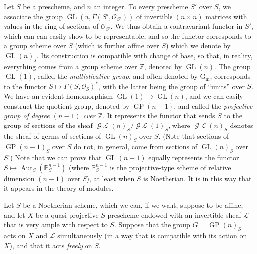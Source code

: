 \documentclass{article}
\newcommand{\oldpage}[1]{\marginpar{\footnotesize$\Big\vert$ \textit{p.~#1}}}
\theoremstyle{definition}
\theoremstyle{definition}
\theoremstyle{definition}
\theoremstyle{definition}
\theoremstyle{remark}
\begin{document}
Let \(S\) be a prescheme, and \(n\) an integer.
To every prescheme \(S'\) over \(S\), we associate the group \(\operatorname{GL}(n,\Gamma(S',{\mathcal{O}}_{S'}))\) of invertible \((n\times n)\) matrices with values in the ring of sections of \({\mathcal{O}}_{S'}\).
We thus obtain a contravariant functor in \(S'\), which can can easily show to be representable, and so the functor corresponds to a group scheme over \(S\) (which is further affine over \(S\)) which we denote by \(\operatorname{GL}(n)_s\).
Its construction is compatible with change of base, so that, in reality, everything comes from a group scheme over \(\mathbb{Z}\), denoted by \(\operatorname{GL}(n)\).
The group \(\operatorname{GL}(1)\), called the \emph{multiplicative group}, and often denoted by \(\operatorname{G_m}\), corresponds to the functor \(S\mapsto\Gamma(S,{\mathcal{O}}_S)^*\), with the latter being the group of ``units'' over \(S\).
We have an evident homomorphism \(\operatorname{GL}(1)\to\operatorname{GL}(n)\), and we can easily construct the quotient group, denoted by \(\operatorname{GP}(n-1)\), and called the \emph{projective group of degree $(n-1)$ over $\mathbb{Z}$}.
It represents the functor that sends \(S\) to the group of sections of the sheaf \(\operatorname{\mathscr{G}\!\!\mathscr{L}}(n)_S/\operatorname{\mathscr{G}\!\!\mathscr{L}}(1)_S\), where \(\operatorname{\mathscr{G}\!\!\mathscr{L}}(n)_S\) denotes the sheaf of germs of sections of \(\operatorname{GL}(n)_S\) over \(S\).
(Note that sections of \(\operatorname{GP}(n-1)_S\) over \(S\) do not, in general, come from sections of \(\operatorname{GL}(n)_S\) over \(S\)!)
Note that we can prove that \(\operatorname{GL}(n-1)\) equally represents the functor \(S\mapsto\operatorname{Aut}_S(\mathbb{P}_S^{n-1})\) (where \(\mathbb{P}_S^{n-1}\) is the projective-type scheme of relative dimension \((n-1)\) over \(S\)), at least when \(S\) is Noetherian.
It is in this way that it appears in the theory of modules.

Let \(S\) be a Noetherian scheme, which we can, if we want, suppose to be affine, and let \(X\) be a quasi-projective \(S\)-prescheme endowed with an invertible sheaf \({\mathscr{L}}\) that is very ample with respect to \(S\).
\oldpage{212-19}Suppose that the group \(G=\operatorname{GP}(n)_S\) acts on \(X\) and \({\mathscr{L}}\) simultaneously (in a way that is compatible with its action on \(X\)), and that it acts \emph{freely} on \(S\).
\end{document}
